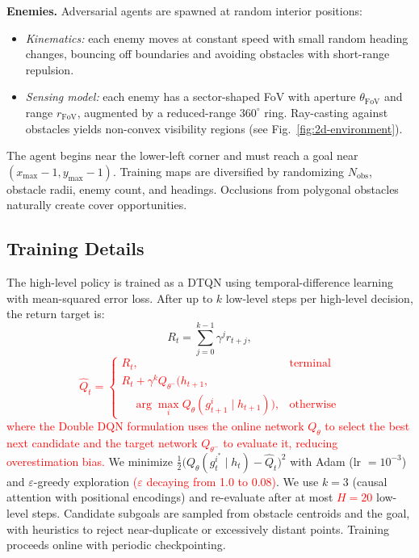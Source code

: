 \documentclass[letterpaper, 10 pt, conference]{ieeeconf}
\begin{document}
\textbf{Enemies.} Adversarial agents are spawned at random interior positions:
\begin{itemize}
    \item \emph{Kinematics:} each enemy moves at constant speed with small random heading changes, bouncing off boundaries and avoiding obstacles with short-range repulsion.
    \item \emph{Sensing model:} each enemy has a sector-shaped FoV with aperture $\theta_{\text{FoV}}$ and range $r_{\text{FoV}}$, augmented by a reduced-range $360^\circ$ ring. Ray-casting against obstacles yields non-convex visibility regions (see Fig.~\ref{fig:2d-environment}).
\end{itemize}

The agent begins near the lower-left corner and must reach a goal near $(x_{\max}-1, y_{\max}-1)$. Training maps are diversified by randomizing $N_{\text{obs}}$, obstacle radii, enemy count, and headings. Occlusions from polygonal obstacles naturally create cover opportunities.

\subsection{Training Details}
The high-level policy is trained as a DTQN using temporal-difference learning with mean-squared error loss. After up to $k$ low-level steps per high-level decision, the return target is:
\[
R_t = \sum_{j=0}^{k-1} \gamma^j r_{t+j},
\]
\textcolor{red}{
\begin{equation}
\hat{Q}_t =
\begin{cases} 
R_t, & \text{terminal} \\
R_t + \gamma^k Q_{\theta^-} \Big( h_{t+1}, & \\ 
\quad \arg\max_{i} Q_\theta(g_{t+1}^i \mid h_{t+1}) \Big), & \text{otherwise}
\end{cases}
\end{equation}
where the Double DQN formulation uses the online network $Q_\theta$ to select the best next candidate and the target network $Q_{\theta^-}$ to evaluate it, reducing overestimation bias.
}
We minimize $\tfrac{1}{2}\big(Q_\theta(g_t^{i^*} \mid h_t) - \hat{Q}_t\big)^2$ with Adam (lr $=10^{-3}$) and $\varepsilon$-greedy exploration \textcolor{red}{($\varepsilon$ decaying from 1.0 to 0.08)}. We use $k=3$ (causal attention with positional encodings) and re-evaluate after at most \textcolor{red}{$H=20$} low-level steps. Candidate subgoals are sampled from obstacle centroids and the goal, with heuristics to reject near-duplicate or excessively distant points. Training proceeds online with periodic checkpointing.
\end{document}
